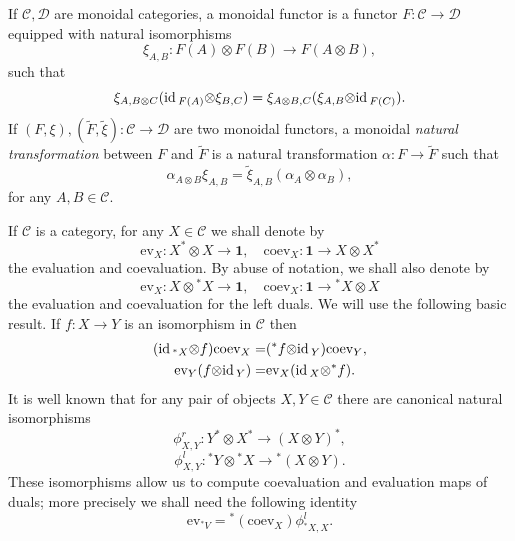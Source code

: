 \documentclass[11pt]{amsart}
\newcommand{\coev}{\mbox{coev}}
\newcommand{\ev}{\mbox{ev}}
\newcommand{\ca}{{\mathcal C}}
\newcommand{\ot}{{\otimes}}
\newcommand{\Do}{{\mathcal D}}
\newcommand{\uno}{ \mathbf{1}}
\newcommand{\id}{\mbox{\rm id\,}}
\renewcommand{\_}[1]{\mbox{$_{\left( #1 \right)}$}}
\theoremstyle{plain}
\numberwithin{equation}{section}
\theoremstyle{definition}
\theoremstyle{remark}
\theoremstyle{introTheorems}
\begin{document}
\medbreak


If $\ca, \Do$ are monoidal categories, a monoidal functor is a functor $F:\ca\to \Do$ equipped with natural isomorphisms
$$\xi_{A,B}:F(A)\ot F(B)\to F(A\ot B), $$
such that
\begin{equation}\label{monoidal-functor}
\xi_{A,B\ot C} (\id_{F(A)}\ot \xi_{B,C})=\xi_{A\ot B, C} (\xi_{A,B}\ot \id_{F(C)}). 
\end{equation}
If $(F,\xi), (\widetilde{F}, \widetilde{\xi}):\ca\to \Do$ are two monoidal functors, a monoidal \textit{natural transformation} between $F$ and $\widetilde{F}$ is a natural transformation $\alpha:F\to \widetilde{F}$ such that
\begin{equation}\label{natural-monoidal}
\alpha_{A\ot B} \xi_{A,B}=\widetilde{\xi}_{A,B} (\alpha_A\ot \alpha_B),
\end{equation}
for any $A,B\in \ca$.
\medbreak

If $\ca$ is a category, for any $X\in \ca$ we shall denote by 
$$ \ev_X:X^*\ot X\to \uno, \quad \coev_X:\uno\to X\ot X^*$$
the evaluation and coevaluation. By abuse of notation, we shall also denote by
$$\ev_X:X\ot {}^*X\to \uno,  \quad \coev_X:\uno\to  {}^*X\ot X$$
the evaluation and coevaluation for the left duals. We will use the following basic result.
If $f:X\to Y$ is an isomorphism in $\ca$ then
\begin{align}\label{duality-iso} \begin{split} (\id_{ {}^*X}\ot f )\coev_X=& ({}^*f\ot \id_Y )\coev_Y,\\
\ev_Y (f\ot  \id_Y)=&\ev_X (\id_X\ot {}^*f).
\end{split}
\end{align}
 It is well known that for any pair of objects $X, Y\in \ca$ there are canonical natural isomorphisms
\begin{equation}\label{duals-product-r}
 \phi^r_{X,Y}: Y^* \ot X^* \to(X\ot Y)^*,
\end{equation} 
\begin{equation}\label{duals-product-l}
 \phi^l_{X,Y}: {}^*Y \ot {}^*X \to {}^*(X\ot Y).
\end{equation} 
These isomorphisms allow us to compute coevaluation and evaluation maps of duals; more precisely we shall need the following identity
\begin{equation}\label{coev-of-dual} \ev_{{}^*V}=  {}^*(\coev_X) \phi^l_{{}^*X,X}.
\end{equation} 
\end{document}
